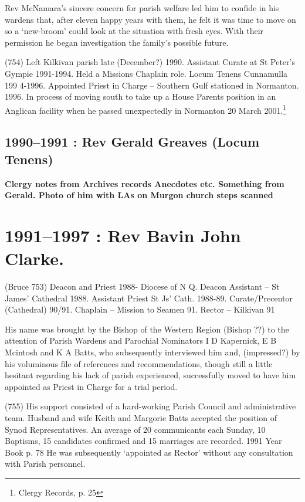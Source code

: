 Rev McNamara's sincere concern for parish welfare led him to confide in
his wardens that, after eleven happy years with them, he felt it was
time to move on so a `new-broom' could look at the situation with fresh
eyes. With their permission he began investigation the family's possible
future.

(754) Left Kilkivan parish late (December?) 1990. Assistant Curate at St
Peter's Gympie 1991-1994. Held a Missions Chaplain role. Locum Tenens
Cunnamulla 199 4-1996. Appointed Priest in Charge -- Southern Gulf
stationed in Normanton. 1996. In process of moving south to take up a
House Parents position in an Anglican facility when he passed
unexpectedly in Normanton 20 March 2001.\footnote{Clergy Records, p. 25}

\section{1990--1991 : Rev Gerald Greaves (Locum
Tenens)}

\textbf{Clergy notes from Archives records Anecdotes etc. Something from
Gerald. Photo of him with LAs on Murgon church steps scanned}

\printendnotes[custom]
\setcounter{endnote}{0}
\chapter{1991--1997 : Rev Bavin John
Clarke.}

(Bruce 753) Deacon and Priest 1988- Diocese of N Q. Deacon Assistant --
St James' Cathedral 1988. Assistant Priest St Js' Cath. 1988-89.
Curate/Precentor (Cathedral) 90/91. Chaplain -- Mission to Seamen 91.
Rector -- Kilkivan 91

His name was brought by the Bishop of the Western Region (Bishop ??) to
the attention of Parish Wardens and Parochial Nominators I D Kapernick,
E B Mcintosh and K A Batts, who subsequently interviewed him and,
(impressed?) by his voluminous file of references and recommendations,
though still a little hesitant regarding his lack of parish experienced,
successfully moved to have him appointed as Priest in Charge for a trial
period.

(755) His support consisted of a hard-working Parish Council and
administrative team. Husband and wife Keith and Margorie Batts accepted
the position of Synod Representatives. An average of 20 communicants
each Sunday, 10 Baptisms, 15 candidates confirmed and 15 marriages are
recorded. 1991 Year Book p. 78 He was subsequently `appointed as Rector'
without any consultation with Parish personnel.


